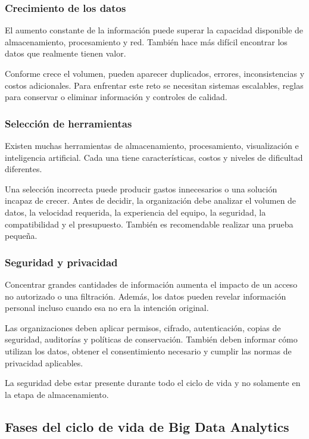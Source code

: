 \subsubsection*{Crecimiento de los datos}

El aumento constante de la información puede superar la capacidad disponible
de almacenamiento, procesamiento y red. También hace más difícil encontrar los
datos que realmente tienen valor.

Conforme crece el volumen, pueden aparecer duplicados, errores,
inconsistencias y costos adicionales. Para enfrentar este reto se necesitan
sistemas escalables, reglas para conservar o eliminar información y controles
de calidad.

\subsubsection*{Selección de herramientas}

Existen muchas herramientas de almacenamiento, procesamiento, visualización e
inteligencia artificial. Cada una tiene características, costos y niveles de
dificultad diferentes.

Una selección incorrecta puede producir gastos innecesarios o una solución
incapaz de crecer. Antes de decidir, la organización debe analizar el volumen
de datos, la velocidad requerida, la experiencia del equipo, la seguridad, la
compatibilidad y el presupuesto. También es recomendable realizar una prueba
pequeña.

\subsubsection*{Seguridad y privacidad}

Concentrar grandes cantidades de información aumenta el impacto de un acceso
no autorizado o una filtración. Además, los datos pueden revelar información
personal incluso cuando esa no era la intención original.

Las organizaciones deben aplicar permisos, cifrado, autenticación, copias de
seguridad, auditorías y políticas de conservación. También deben informar
cómo utilizan los datos, obtener el consentimiento necesario y cumplir las
normas de privacidad aplicables.

La seguridad debe estar presente durante todo el ciclo de vida y no solamente
en la etapa de almacenamiento.

\subsection{Fases del ciclo de vida de Big Data Analytics}

